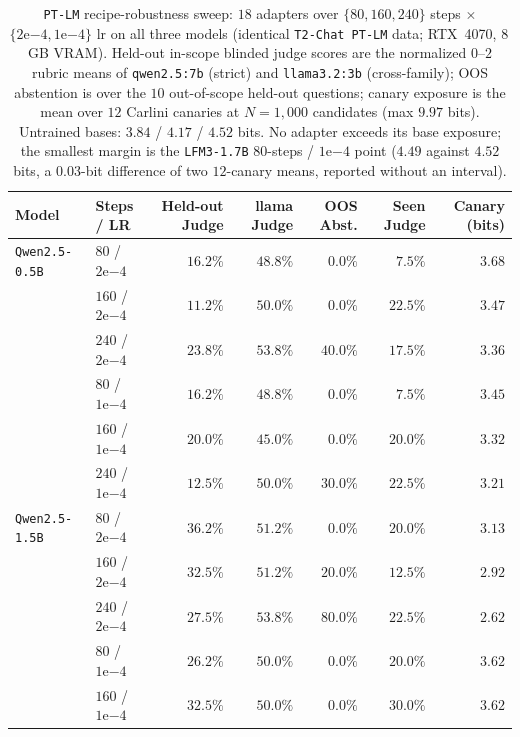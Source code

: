 \documentclass{article}
\begin{document}
\begin{table}[t]
\caption{\texttt{PT-LM} recipe-robustness sweep: $18$ adapters over $\{80, 160, 240\}$ steps $\times$ $\{2\mathrm{e}{-4}, 1\mathrm{e}{-4}\}$ lr on all three models (identical \texttt{T2-Chat PT-LM} data; RTX~4070, 8\,GB VRAM). Held-out in-scope blinded judge scores are the normalized $0$--$2$ rubric means of \texttt{qwen2.5:7b} (strict) and \texttt{llama3.2:3b} (cross-family); OOS abstention is over the $10$ out-of-scope held-out questions; canary exposure is the mean over $12$ Carlini canaries at $N{=}1{,}000$ candidates (max $9.97$ bits). Untrained bases: $3.84$ / $4.17$ / $4.52$ bits. No adapter exceeds its base exposure; the smallest margin is the \texttt{LFM3-1.7B} $80$-steps / $1\mathrm{e}{-4}$ point ($4.49$ against $4.52$ bits, a $0.03$-bit difference of two $12$-canary means, reported without an interval).}
\label{tab:ptlm-sweep}
\vskip 0.08in
\begin{center}
\footnotesize
\setlength{\tabcolsep}{4.5pt}
\begin{tabular}{llrrrrr}
\toprule
\textbf{Model} & \textbf{Steps / LR} & \textbf{Held-out Judge} & \textbf{llama Judge} & \textbf{OOS Abst.} & \textbf{Seen Judge} & \textbf{Canary (bits)} \\
\midrule
\texttt{Qwen2.5-0.5B} & $80$ / $2\mathrm{e}{-4}$ & $16.2\%$ & $48.8\%$ & $0.0\%$ & $7.5\%$ & $3.68$ \\
 & $160$ / $2\mathrm{e}{-4}$ & $11.2\%$ & $50.0\%$ & $0.0\%$ & $22.5\%$ & $3.47$ \\
 & $240$ / $2\mathrm{e}{-4}$ & $23.8\%$ & $53.8\%$ & $40.0\%$ & $17.5\%$ & $3.36$ \\
 & $80$ / $1\mathrm{e}{-4}$ & $16.2\%$ & $48.8\%$ & $0.0\%$ & $7.5\%$ & $3.45$ \\
 & $160$ / $1\mathrm{e}{-4}$ & $20.0\%$ & $45.0\%$ & $0.0\%$ & $20.0\%$ & $3.32$ \\
 & $240$ / $1\mathrm{e}{-4}$ & $12.5\%$ & $50.0\%$ & $30.0\%$ & $22.5\%$ & $3.21$ \\
\midrule
\texttt{Qwen2.5-1.5B} & $80$ / $2\mathrm{e}{-4}$ & $36.2\%$ & $51.2\%$ & $0.0\%$ & $20.0\%$ & $3.13$ \\
 & $160$ / $2\mathrm{e}{-4}$ & $32.5\%$ & $51.2\%$ & $20.0\%$ & $12.5\%$ & $2.92$ \\
 & $240$ / $2\mathrm{e}{-4}$ & $27.5\%$ & $53.8\%$ & $80.0\%$ & $22.5\%$ & $2.62$ \\
 & $80$ / $1\mathrm{e}{-4}$ & $26.2\%$ & $50.0\%$ & $0.0\%$ & $20.0\%$ & $3.62$ \\
 & $160$ / $1\mathrm{e}{-4}$ & $32.5\%$ & $50.0\%$ & $0.0\%$ & $30.0\%$ & $3.62$ \\

\end{tabular}
\end{center}
\end{table}
\end{document}
